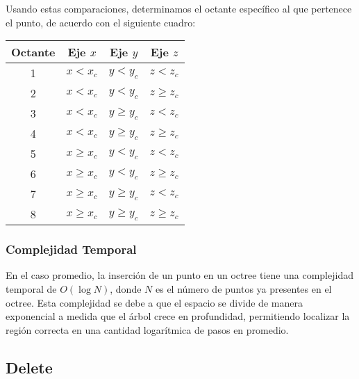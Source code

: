 \documentclass{article}
\begin{document}
Usando estas comparaciones, determinamos el octante específico al que pertenece el punto, de acuerdo con el siguiente cuadro:

\begin{center}
    \begin{tabular}{c|c|c|c}
        Octante & Eje \(x\) & Eje \(y\) & Eje \(z\) \\
        \hline
        1 & \(x < x_c\) & \(y < y_c\) & \(z < z_c\) \\
        2 & \(x < x_c\) & \(y < y_c\) & \(z \geq z_c\) \\
        3 & \(x < x_c\) & \(y \geq y_c\) & \(z < z_c\) \\
        4 & \(x < x_c\) & \(y \geq y_c\) & \(z \geq z_c\) \\
        5 & \(x \geq x_c\) & \(y < y_c\) & \(z < z_c\) \\
        6 & \(x \geq x_c\) & \(y < y_c\) & \(z \geq z_c\) \\
        7 & \(x \geq x_c\) & \(y \geq y_c\) & \(z < z_c\) \\
        8 & \(x \geq x_c\) & \(y \geq y_c\) & \(z \geq z_c\) \\
    \end{tabular}
\end{center}

\subsubsection{Complejidad Temporal}

En el caso promedio, la inserción de un punto en un octree tiene una complejidad temporal de \(O(\log N)\), donde \(N\) es el número de puntos ya presentes en el octree. Esta complejidad se debe a que el espacio se divide de manera exponencial a medida que el árbol crece en profundidad, permitiendo localizar la región correcta en una cantidad logarítmica de pasos en promedio.


\subsection{Delete}
\end{document}
